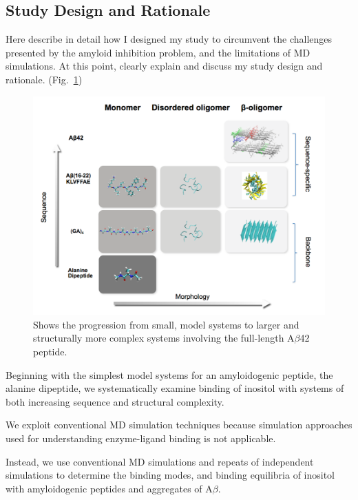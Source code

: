 \subsection{Study Design and Rationale}
\begin{outline}
	\1 Here describe in detail how I designed my study to circumvent the challenges presented by the amyloid inhibition problem, and the limitations  of MD simulations. At this point, clearly explain and discuss my study design and rationale. (Fig.~\ref{fig:rationale})

  \begin{figure}
    \centering
    \includegraphics[width=6in]{figures/introduction/matrix.pdf}
    \caption[Rationale]{Shows the progression from small, model systems to larger and structurally more complex systems involving the full-length A$\beta$42 peptide.}
    \label{fig:rationale}
  \end{figure}

	\1 Beginning with the simplest model systems for an amyloidogenic peptide, the alanine dipeptide, we systematically examine binding of inositol with systems of both increasing sequence and structural complexity.

	\1 We exploit conventional MD simulation techniques because simulation approaches used for understanding enzyme-ligand binding is not applicable. 
	
	\1 Instead, we use conventional MD simulations and repeats of independent simulations to determine the binding modes, and binding equilibria of inositol with amyloidogenic peptides and aggregates of A$\beta$.
\end{outline}

